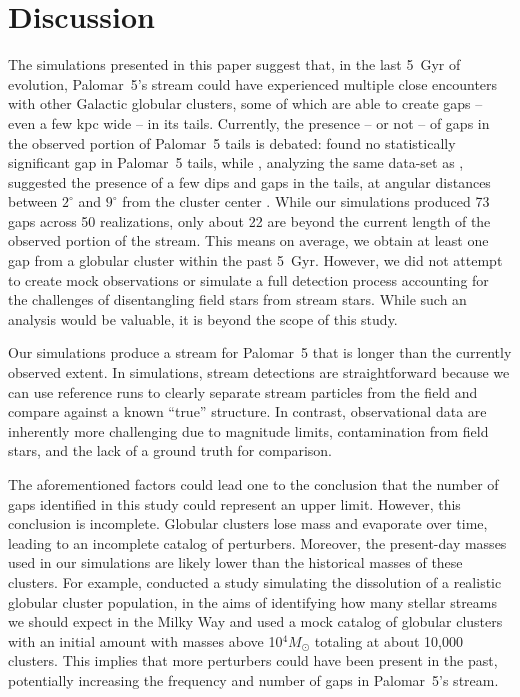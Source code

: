 \documentclass{aa}
\begin{document}
  
  
\section{Discussion}
  
  The simulations presented in this paper suggest that, in the last 5~Gyr of evolution, Palomar~5's stream could have experienced multiple close encounters with other Galactic globular clusters, some of which are able to create gaps -- even a few kpc wide -- in its tails. Currently, the presence -- or not -- of gaps in the observed portion of Palomar~5 tails is debated: \citet{2016ApJ...819....1I} found no statistically significant gap in Palomar~5 tails, while \citet{2017MNRAS.470...60E}, analyzing the same data-set as \citet{2016ApJ...819....1I}, suggested the presence of a few dips and gaps in the tails, at angular distances between $2^\circ$ and $9^\circ$ from the cluster center \citep[see also][]{ 2020ApJ...889...70B}. While our simulations produced 73 gaps across 50 realizations, only about 22 are beyond the current length of the observed portion of the stream. This means on average, we obtain at least one gap from a globular cluster within the past 5~Gyr. However, we did not attempt to create mock observations or simulate a full detection process accounting for the challenges of disentangling field stars from stream stars. While such an analysis would be valuable, it is beyond the scope of this study.

  
  Our simulations produce a stream for Palomar~5 that is longer than the currently observed extent. In simulations, stream detections are straightforward because we can use reference runs to clearly separate stream particles from the field and compare against a known ``true'' structure. In contrast, observational data are inherently more challenging due to magnitude limits, contamination from field stars, and the lack of a ground truth for comparison. 
  
  The aforementioned factors could lead one to the conclusion that the number of gaps identified in this study could represent an upper limit. However, this conclusion is incomplete. Globular clusters lose mass and evaporate over time, leading to an incomplete catalog of perturbers. Moreover, the present-day masses used in our simulations are likely lower than the historical masses of these clusters. For example, \citet{2024ApJ...976...54P} conducted a study simulating the dissolution of a realistic globular cluster population, in the aims of identifying how many stellar streams we should expect in the Milky Way and used a mock catalog of globular clusters with an initial amount with masses above 10$^4 M_\odot$ totaling at about 10,000 clusters. This implies that more perturbers could have been present in the past, potentially increasing the frequency and number of gaps in Palomar~5's stream.
  
\end{document}
